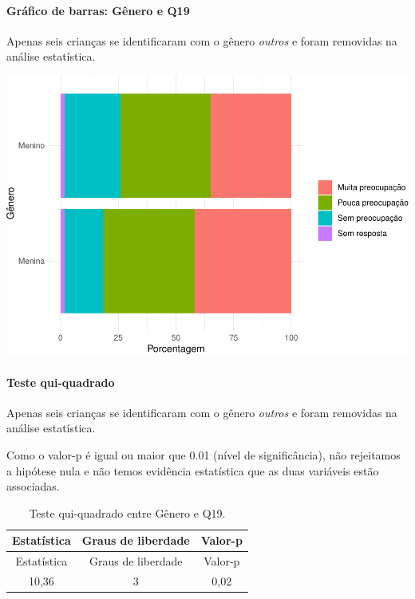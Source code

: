 \documentclass[]{article}
\let\oldparagraph\paragraph
\renewcommand{\paragraph}[1]{\oldparagraph{#1}\mbox{}}
\begin{document}
\hypertarget{gruxe1fico-de-barras-guxeanero-e-q19}{%
\paragraph{Gráfico de barras: Gênero e Q19}\label{gruxe1fico-de-barras-guxeanero-e-q19}}

Apenas seis crianças se identificaram com o gênero \emph{outros} e foram removidas na análise estatística.

\begin{center}\includegraphics[width=0.75\linewidth]{relatorio_covid19_files/figure-latex/unnamed-chunk-319-1} \end{center}

\hypertarget{teste-qui-quadrado-28}{%
\paragraph{Teste qui-quadrado}\label{teste-qui-quadrado-28}}

Apenas seis crianças se identificaram com o gênero \emph{outros} e foram removidas na análise estatística.

Como o valor-p é igual ou maior que 0.01 (nível de significância), não rejeitamos a hipótese nula e não temos evidência estatística que as duas variáveis estão associadas.

\begin{longtable}[]{@{}ccc@{}}
\caption{\label{tab:unnamed-chunk-321}Teste qui-quadrado entre Gênero e Q19.}\tabularnewline
\toprule
Estatística & Graus de liberdade & Valor-p\tabularnewline
\midrule
\endfirsthead
\toprule
Estatística & Graus de liberdade & Valor-p\tabularnewline
\midrule
\endhead
10,36 & 3 & 0,02\tabularnewline
\bottomrule
\end{longtable}

\cleardoublepage
\end{document}
